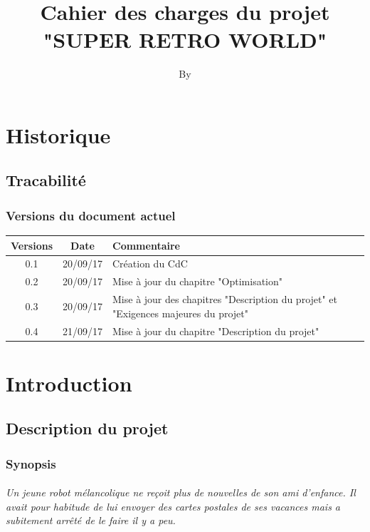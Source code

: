 \documentclass{report}
\begin{document}
	\title{Cahier des charges du projet "SUPER RETRO WORLD"}
	\author{By }
	\date{} 

	\tableofcontents

	\part{Historique}
		\chapter{Tracabilit\'{e}}
			\section{Versions du document actuel}
\begin{tabular}{|c|c|l|}
\hline
Versions & Date & Commentaire \\
\hline
0.1 & 20/09/17 & Cr\'{e}ation du CdC \\
\hline
0.2 & 20/09/17 & Mise à jour du chapitre "Optimisation" \\
\hline
0.3 & 20/09/17 & Mise à jour des chapitres "Description du projet" et "Exigences majeures du projet" \\
\hline
0.4 & 21/09/17 & Mise à jour du chapitre "Description du projet" \\
\hline
\end{tabular}

	\setcounter{chapter}{0}

	\part{Introduction}
	\setcounter{chapter}{0}
		\chapter{Description du projet}
			\section{Synopsis}

\paragraph{{\color{red}Un jeune robot} m\'{e}lancolique ne reçoit plus de nouvelles de son ami d’enfance. Il avait pour habitude de lui envoyer des cartes postales de ses vacances mais a subitement arrêt\'{e} de le faire il y a peu. }
\end{document}
